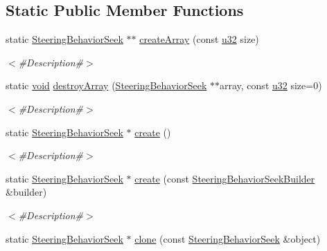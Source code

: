 \subsection*{Static Public Member Functions}
\begin{DoxyCompactItemize}
\item 
static \mbox{\hyperlink{classnjli_1_1_steering_behavior_seek}{Steering\+Behavior\+Seek}} $\ast$$\ast$ \mbox{\hyperlink{classnjli_1_1_steering_behavior_seek_ac9ad7111b7a6ca096d65cb545482738e}{create\+Array}} (const \mbox{\hyperlink{_util_8h_a10e94b422ef0c20dcdec20d31a1f5049}{u32}} size)
\begin{DoxyCompactList}\small\item\em $<$\#\+Description\#$>$ \end{DoxyCompactList}\item 
static \mbox{\hyperlink{_thread_8h_af1e856da2e658414cb2456cb6f7ebc66}{void}} \mbox{\hyperlink{classnjli_1_1_steering_behavior_seek_a3a1aee136c7396be018e2a59a53aa300}{destroy\+Array}} (\mbox{\hyperlink{classnjli_1_1_steering_behavior_seek}{Steering\+Behavior\+Seek}} $\ast$$\ast$array, const \mbox{\hyperlink{_util_8h_a10e94b422ef0c20dcdec20d31a1f5049}{u32}} size=0)
\begin{DoxyCompactList}\small\item\em $<$\#\+Description\#$>$ \end{DoxyCompactList}\item 
static \mbox{\hyperlink{classnjli_1_1_steering_behavior_seek}{Steering\+Behavior\+Seek}} $\ast$ \mbox{\hyperlink{classnjli_1_1_steering_behavior_seek_a7e7c207db9cc51c0f8b659fa6fe970fd}{create}} ()
\begin{DoxyCompactList}\small\item\em $<$\#\+Description\#$>$ \end{DoxyCompactList}\item 
static \mbox{\hyperlink{classnjli_1_1_steering_behavior_seek}{Steering\+Behavior\+Seek}} $\ast$ \mbox{\hyperlink{classnjli_1_1_steering_behavior_seek_af048f29143c4223cbe17b27ecc98c244}{create}} (const \mbox{\hyperlink{classnjli_1_1_steering_behavior_seek_builder}{Steering\+Behavior\+Seek\+Builder}} \&builder)
\begin{DoxyCompactList}\small\item\em $<$\#\+Description\#$>$ \end{DoxyCompactList}\item 
static \mbox{\hyperlink{classnjli_1_1_steering_behavior_seek}{Steering\+Behavior\+Seek}} $\ast$ \mbox{\hyperlink{classnjli_1_1_steering_behavior_seek_ae9baeaddd6dff6b7caa469e4343f9295}{clone}} (const \mbox{\hyperlink{classnjli_1_1_steering_behavior_seek}{Steering\+Behavior\+Seek}} \&object)

\end{DoxyCompactItemize}
